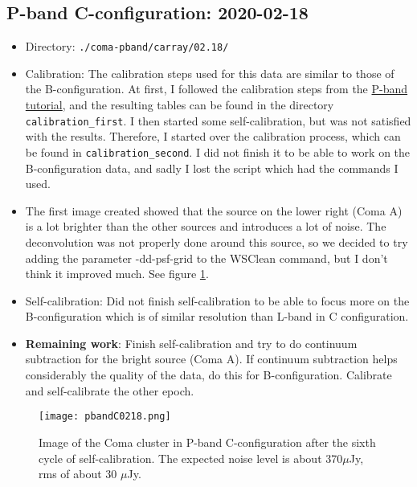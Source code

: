 \documentclass[11pt,letterpaper]{article}
\begin{document}
\subsection{P-band C-configuration: 2020-02-18}
\begin{itemize}
    \item Directory: \verb|./coma-pband/carray/02.18/|
    \item Calibration: The calibration steps used for this data are similar to those of the B-configuration. At first, I followed the calibration steps from the \href{https://casaguides.nrao.edu/index.php/VLA_Radio_galaxy_3C_129:_P-band_continuum_tutorial-CASA6.4.1}{P-band tutorial}, and the resulting tables can be found in the directory \verb|calibration_first|. I then started some self-calibration, but was not satisfied with the results. Therefore, I started over the calibration process, which can be found in \verb|calibration_second|. I did not finish it to be able to work on the B-configuration data, and sadly I lost the script which had the commands I used. 
    \item The first image created showed that the source on the lower right (Coma A) is a lot brighter than the other sources and introduces a lot of noise. The deconvolution was not properly done around this source, so we decided to try adding the parameter -dd-psf-grid to the WSClean command, but I don't think it improved much. See figure \ref{fig:pbandC0218}.
    \item Self-calibration: Did not finish self-calibration to be able to focus more on the B-configuration which is of similar resolution than L-band in C configuration.
    \item \textbf{Remaining work}: Finish self-calibration and try to do continuum subtraction for the bright source (Coma A). If continuum subtraction helps considerably the quality of the data, do this for B-configuration. Calibrate and self-calibrate the other epoch.
\end{itemize}
\begin{figure}
    \centering
    \texttt{[image: pbandC0218.png]}
    \caption{Image of the Coma cluster in P-band C-configuration after the sixth cycle of self-calibration. The expected noise level is about 370$\mu$Jy, rms of about 30 $\mu$Jy.}
    \label{fig:pbandC0218}
\end{figure}
\end{document}
